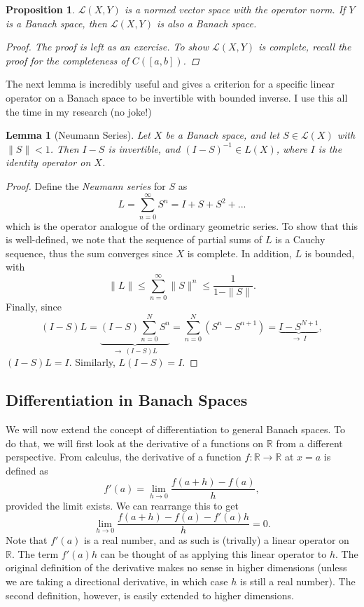 \documentclass[12pt]{amsart}         %
\newtheorem{proposition}{Proposition}[section]
\newtheorem{lemma}{Lemma}[section]
\theoremstyle{remark}
\newcommand{\R}{\mathbb{R}}
\begin{document}
\begin{proposition}
$\mathcal{L}(X, Y)$ is a normed vector space with the operator norm. If $Y$ is a Banach space, then $\mathcal{L}(X, Y)$ is also a Banach space.
\begin{proof}
The proof is left as an exercise. To show $\mathcal{L}(X, Y)$ is complete, recall the proof for the completeness of $C([a,b])$.
\end{proof}
\end{proposition}

The next lemma is incredibly useful and gives a criterion for a specific linear operator on a Banach space to be invertible with bounded inverse. I use this all the time in my research (no joke!)

\begin{lemma}[Neumann Series]
Let $X$ be a Banach space, and let $S \in \mathcal{L}(X)$ with $\|S\| < 1$. Then $I - S$ is invertible, and $(I - S)^{-1} \in L(X)$, where $I$ is the identity operator on $X$.
\end{lemma}

\begin{proof}
Define the \emph{Neumann series} for $S$ as 
\[
L = \sum_{n=0}^{\infty} S^n = I + S + S^2 + ... 
\]
which is the operator analogue of the ordinary geometric series. To show that this is well-defined, we note that the sequence of partial sums of $L$ is a Cauchy sequence, thus the sum converges since $X$ is complete. In addition, $L$ is bounded,
with
\[
\|L\| \leq \sum_{n=0}^\infty \|S\|^n \leq \frac{1}{1 - \|S\|}.
\]
Finally, since
\[(I - S)L = \underbrace{(I - S) \sum_{n=0}^{N} S^n}_{\rightarrow \: (I-S)L} = \sum_{n=0}^N (S^n - S^{n+1}) = 
\underbrace{I - S^{N+1}}_{\rightarrow \: I},
\]
$(I-S)L = I$. Similarly, $L(I - S) = I$.
\end{proof}

\subsection{Differentiation in Banach Spaces}

We will now extend the concept of differentiation to general Banach spaces. To do that, we will first look at the derivative of a functions on $\R$ from a different perspective. From calculus, the derivative of a function $f: \R \rightarrow \R$ at $x = a$ is defined as 
\[
f'(a) = \lim_{h \rightarrow 0}\frac{f(a + h) - f(a)}{h},
\]
provided the limit exists. We can rearrange this to get
\[
\lim_{h \rightarrow 0}\frac{f(a + h) - f(a) - f'(a) h }{h} = 0.
\]
Note that $f'(a)$ is a real number, and as such is (trivally) a linear operator on $\R$. The term $f'(a) h$ can be thought of as applying this linear operator to $h$. The original definition of the derivative makes no sense in higher dimensions (unless we are taking a directional derivative, in which case $h$ is still a real number). The second definition, however, is easily extended to higher dimensions.
\end{document}
